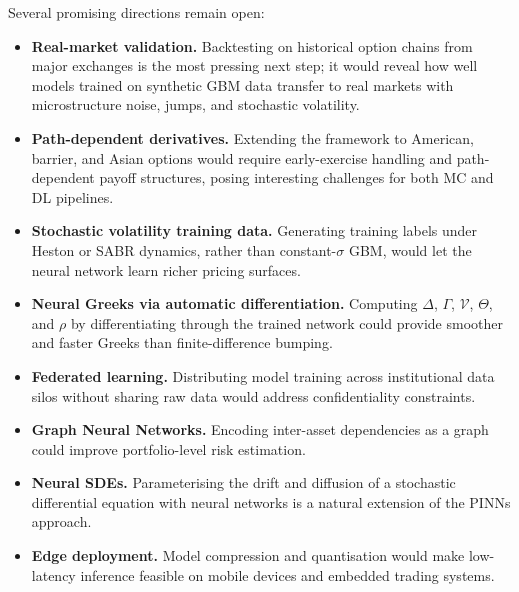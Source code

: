 \documentclass[conference]{IEEEtran}
\begin{document}
Several promising directions remain open:
\begin{itemize}
    \item \textbf{Real-market validation.} Backtesting on historical option chains from major exchanges is the most pressing next step; it would reveal how well models trained on synthetic GBM data transfer to real markets with microstructure noise, jumps, and stochastic volatility.
    \item \textbf{Path-dependent derivatives.} Extending the framework to American, barrier, and Asian options would require early-exercise handling and path-dependent payoff structures, posing interesting challenges for both MC and DL pipelines.
    \item \textbf{Stochastic volatility training data.} Generating training labels under Heston or SABR dynamics, rather than constant-$\sigma$ GBM, would let the neural network learn richer pricing surfaces.
    \item \textbf{Neural Greeks via automatic differentiation.} Computing $\Delta$, $\Gamma$, $\mathcal{V}$, $\Theta$, and $\rho$ by differentiating through the trained network could provide smoother and faster Greeks than finite-difference bumping.
    \item \textbf{Federated learning.} Distributing model training across institutional data silos without sharing raw data would address confidentiality constraints.
    \item \textbf{Graph Neural Networks.} Encoding inter-asset dependencies as a graph could improve portfolio-level risk estimation.
    \item \textbf{Neural SDEs.} Parameterising the drift and diffusion of a stochastic differential equation with neural networks is a natural extension of the PINNs approach.
    \item \textbf{Edge deployment.} Model compression and quantisation would make low-latency inference feasible on mobile devices and embedded trading systems.
\end{itemize}



\end{document}
